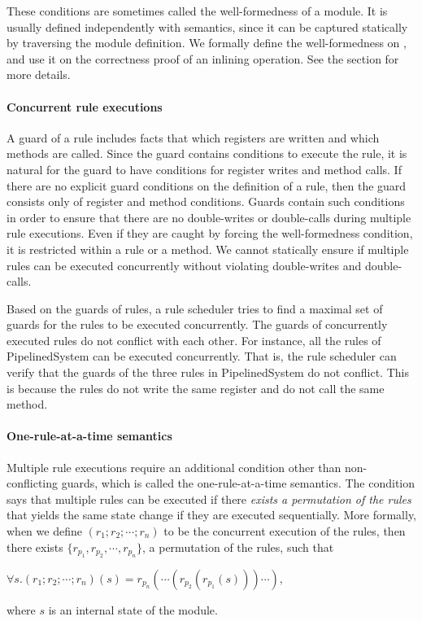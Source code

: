 These conditions are sometimes called the well-formedness of a
module. It is usually defined independently with semantics, since it
can be captured statically by traversing the module definition. We
formally define the well-formedness on , and use it on
the correctness proof of an inlining operation. See the section for
more details.

\paragraph{Concurrent rule executions}

A guard of a rule includes facts that which registers are written and
which methods are called. Since the guard contains conditions to
execute the rule, it is natural for the guard to have conditions for
register writes and method calls. If there are no explicit guard
conditions on the definition of a rule, then the guard consists only
of register and method conditions. Guards contain such conditions in
order to ensure that there are no double-writes or double-calls during
multiple rule executions. Even if they are caught by forcing the
well-formedness condition, it is restricted within a rule or a
method. We cannot statically ensure if multiple rules can be executed
concurrently without violating double-writes and double-calls.

Based on the guards of rules, a rule scheduler tries to find a maximal
set of guards for the rules to be executed concurrently. The guards of
concurrently executed rules do not conflict with each other. For
instance, all the rules of PipelinedSystem can be executed
concurrently. That is, the rule scheduler can verify that the guards
of the three rules in PipelinedSystem do not conflict. This is because
the rules do not write the same register and do not call the same
method.

\paragraph{One-rule-at-a-time semantics}

Multiple rule executions require an additional condition other than
non-conflicting guards, which is called the one-rule-at-a-time
semantics. The condition says that multiple rules can be executed if
there \emph{exists a permutation of the rules} that yields the same
state change if they are executed sequentially. More formally, when we
define $(r_1; r_2; \cdots; r_n)$ to be the concurrent execution of the
rules, then there exists $\{r_{p_1}, r_{p_2}, \cdots, r_{p_n}\}$, a
permutation of the rules, such that
\begin{center}
  \begin{math}
    \forall s. (r_1; r_2; \cdots; r_n)(s) = r_{p_n}(\cdots(r_{p_2}(r_{p_1}(s)))\cdots),
  \end{math}
\end{center}
where $s$ is an internal state of the module.


